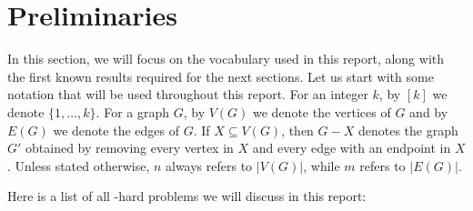 \section{Preliminaries}
\label{section:preliminaries}

In this section, we will focus on the vocabulary used in this report, along with the first known results required for the next sections. Let us start with some notation that will be used throughout this report. For an integer $k$, by $[k]$ we denote $\{1, \dots, k\}$. For a graph $G$, by $V(G)$ we denote the vertices of $G$ and by $E(G)$ we denote the edges of $G$. If $X \subseteq V(G)$, then $G - X$ denotes the graph $G'$ obtained by removing every vertex in $X$ and every edge with an endpoint in $X$. Unless stated otherwise, $n$ always refers to $|V(G)|$, while $m$ refers to $|E(G)|$. 

\medskip

Here is a list of all \NP-hard problems we will discuss in this report:

\begin{problem}
\end{problem}

\begin{problem}
\end{problem}

\begin{problem}
\end{problem}


